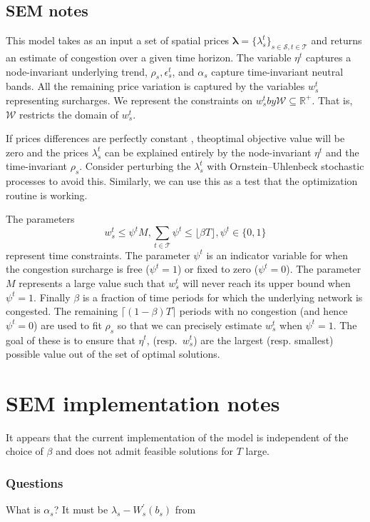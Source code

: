 \documentclass[11pt, letterpaper,nounbold]{article}
\renewcommand{\S}{\mathcal{S}}
\newcommand{\T}{\mathcal{T}}
\begin{document}
\subsection{SEM notes}
This model takes as an input a set of spatial prices $\pmb{\lambda} = \{\lambda_{s}^{t}\}_{s\in \S, t\in \T}$ and returns an estimate of congestion over a given time horizon. The variable $\eta^{t}$ captures a node-invariant underlying trend, $\rho_{s}, \epsilon_{s}^{t}$, and $\alpha_{s}$ capture time-invariant neutral bands. All the remaining price variation is captured by the variables $w_{s}^{t}$ representing surcharges. We represent the constraints on $w_{s}^{t} by \mathcal{W}\subseteq \mathbb{R}^{+}$. That is, $\mathcal{W}$ restricts the domain of $w_{s}^{t}$.

If prices differences are perfectly constant , theoptimal objective value will be zero and the prices $\lambda_{s}^{t}$ can be explained entirely by the node-invariant $\eta^{t}$ and the time-invariant $\rho_{s}$. Consider perturbing the $\lambda_{s}^{t}$ with Ornstein--Uhlenbeck stochastic processes to avoid this. Similarly, we can use this as a test that the optimization routine is working.

The parameters
	\[w_{s}^{t} \leq \psi^{t} M, \sum_{t\in \T} \psi^{t} \leq \lfloor \beta T\rfloor, \psi^{t} \in \{0,1\}\]
represent time constraints. The parameter $\psi^{t}$ is an indicator variable for when the congestion surcharge is free ($\psi^{t} =1$) or fixed to zero ($\psi^{t} = 0$). The parameter $M$ represents a large value such that $w_{s}^{t}$ will never reach its upper bound when $\psi^{t} = 1$. Finally $\beta$ is a fraction of time periods for which the underlying network is congested. The remaining $\lceil (1-\beta) T\rceil$ periods with no congestion (and hence $\psi^{t} = 0$) are used to fit $\rho_{s}$  so that we can precisely estimate $w_{s}^{t}$ when $\psi^{t} = 1$. The goal of these is to ensure that $\eta^{t}$, (resp.~$w_{s}^{t}$) are the largest (resp. smallest) possible value out of the set of optimal solutions.
\section{SEM implementation notes}
It appears that the current implementation of the model is independent of the choice of $\beta$ and does not admit feasible solutions for $T$ large.
\subsubsection*{Questions}
What is $\alpha_{s}$? It must be $\lambda_{s}-W^{\prime}_{s}(b_{s})$ from \cite[p.~7]{Zhu2020}


\end{document}
